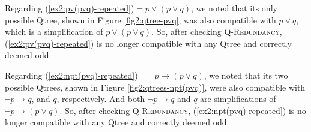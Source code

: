 \begin{exe}
	\ex 
	\begin{xlist}
		\label{ex2:q-redundancy}
		\label{ex2:formal-simplification}
		\label{ex2:q-equivalence}
	\end{xlist}
\end{exe}

Regarding (\ref{ex2:pv(pvq)-repeated})$ = p\vee(p \vee q)$, we noted that its only possible Qtree, shown in Figure \ref{fig2:qtree-pvq}, was also compatible with $p\vee q$, which is a simplification of $p\vee(p \vee q)$. So, after checking \textsc{Q-Redundancy}, (\ref{ex2:pv(pvq)-repeated}) is no longer compatible with any Qtree and correctly deemed odd.

Regarding (\ref{ex2:npt(pvq)-repeated})$ = \neg p\rightarrow(p \vee q)$, we noted that its two possible Qtrees, shown in Figure \ref{fig2:qtrees-npt(pvq)}, were also compatible with $\neg p\rightarrow q$, and $q$, respectively. And both $\neg p\rightarrow q$ and $q$ are simplifications of $\neg p\rightarrow(p \vee q)$. So, after checking \textsc{Q-Redundancy}, (\ref{ex2:npt(pvq)-repeated}) is no longer compatible with any Qtree and correctly deemed odd.


